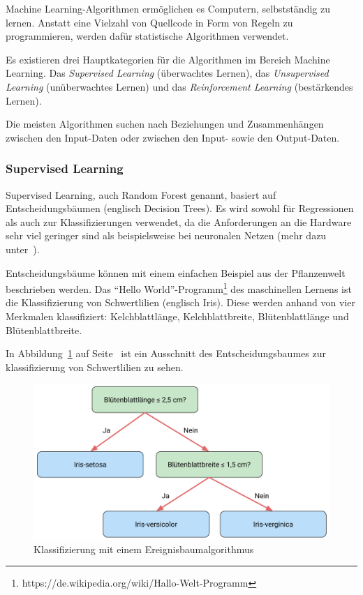 Machine Learning-Algorithmen ermöglichen es Computern, selbstständig zu lernen. Anstatt eine Vielzahl von Quellcode in
Form von Regeln zu programmieren, werden dafür statistische Algorithmen verwendet.

Es existieren drei Hauptkategorien für die Algorithmen im Bereich Machine Learning. Das \textit{Supervised Learning}
(überwachtes Lernen), das \textit{Unsupervised Learning} (unüberwachtes Lernen) und das \textit{Reinforcement Learning}
(bestärkendes Lernen).

Die meisten Algorithmen suchen nach Beziehungen und Zusammenhängen zwischen den Input-Daten oder zwischen den Input-
sowie den Output-Daten.

\subsubsection{Supervised Learning}
Supervised Learning, auch Random Forest genannt, basiert auf Entscheidungsbäumen (englisch Decision Trees). Es wird
sowohl für Regressionen als auch zur Klassifizierungen verwendet, da die Anforderungen an die Hardware sehr viel
geringer sind als beispielsweise bei neuronalen Netzen (mehr dazu unter~\cite{book_grundlagen_learnings}).

Entscheidungsbäume können mit einem einfachen Beispiel aus der Pflanzenwelt beschrieben werden. Das
\enquote{Hello World}-Programm\footnote{https://de.wikipedia.org/wiki/Hallo-Welt-Programm} des maschinellen Lernens ist
die Klassifizierung von Schwertlilien (englisch Iris). Diese werden anhand von vier Merkmalen klassifiziert:
Kelchblattlänge, Kelchblattbreite, Blütenblattlänge und Blütenblattbreite.

In Abbildung~\ref{fig:grundlagen_supervised_learning} auf Seite~\pageref{fig:grundlagen_supervised_learning} ist ein
Ausschnitt des Entscheidungsbaumes zur klassifizierung von Schwertlilien zu sehen.

\begin{figure}[h]
    \centering
    \includegraphics[scale=0.55]{images/kapitel_2/supervised_learning.pdf}
    \caption{Klassifizierung mit einem Ereignisbaumalgorithmus}
    \label{fig:grundlagen_supervised_learning}
\end{figure}

